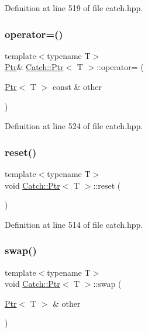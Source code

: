 Definition at line 519 of file catch.\+hpp.

\hypertarget{class_catch_1_1_ptr_af42074444c1bc6a70ebdc406a8617708}{}\label{class_catch_1_1_ptr_af42074444c1bc6a70ebdc406a8617708} 
\subsubsection{\texorpdfstring{operator=()}{operator=()}\hspace{0.1cm}{\footnotesize\ttfamily [2/2]}}
{\footnotesize\ttfamily template$<$typename T$>$ \\
\hyperlink{class_catch_1_1_ptr}{Ptr}\& \hyperlink{class_catch_1_1_ptr}{Catch\+::\+Ptr}$<$ T $>$\+::operator= (\begin{DoxyParamCaption}\item[{\hyperlink{class_catch_1_1_ptr}{Ptr}$<$ T $>$ const \&}]{other }\end{DoxyParamCaption})\hspace{0.3cm}{\ttfamily [inline]}}



Definition at line 524 of file catch.\+hpp.

\hypertarget{class_catch_1_1_ptr_af8d0fa7a2cd20842830b354ac31dfe5c}{}\label{class_catch_1_1_ptr_af8d0fa7a2cd20842830b354ac31dfe5c} 
\subsubsection{\texorpdfstring{reset()}{reset()}}
{\footnotesize\ttfamily template$<$typename T$>$ \\
void \hyperlink{class_catch_1_1_ptr}{Catch\+::\+Ptr}$<$ T $>$\+::reset (\begin{DoxyParamCaption}{ }\end{DoxyParamCaption})\hspace{0.3cm}{\ttfamily [inline]}}



Definition at line 514 of file catch.\+hpp.

\hypertarget{class_catch_1_1_ptr_a172bf8b4e71e26a5a4d92f5b02158b50}{}\label{class_catch_1_1_ptr_a172bf8b4e71e26a5a4d92f5b02158b50} 
\subsubsection{\texorpdfstring{swap()}{swap()}}
{\footnotesize\ttfamily template$<$typename T$>$ \\
void \hyperlink{class_catch_1_1_ptr}{Catch\+::\+Ptr}$<$ T $>$\+::swap (\begin{DoxyParamCaption}\item[{\hyperlink{class_catch_1_1_ptr}{Ptr}$<$ T $>$ \&}]{other }\end{DoxyParamCaption})\hspace{0.3cm}{\ttfamily [inline]}}



